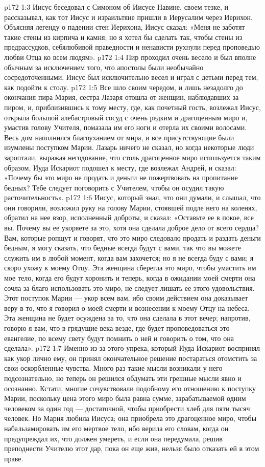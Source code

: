 \vs p172 1:3 Иисус беседовал с Симоном об Иисусе Навине, своем тезке, и рассказывал, как тот Иисус и израильтяне пришли в Иерусалим через Иерихон. Объясняя легенду о падении стен Иерихона, Иисус сказал: «Меня не заботят такие стены из кирпича и камня; но я хотел бы сделать так, чтобы стены из предрассудков, себялюбивой праведности и ненависти рухнули перед проповедью любви Отца ко всем людям».
\vs p172 1:4 Пир проходил очень весело и был вполне обычным за исключением того, что апостолы были необычайно сосредоточенными. Иисус был исключительно весел и играл с детьми перед тем, как подойти к столу.
\vs p172 1:5 \pc Все шло своим чередом, и лишь незадолго до окончания пира Мария, сестра Лазаря отошла от женщин, наблюдавших за пиром, и, приблизившись к тому месту, где, как почетный гость, возлежал Иисус, открыла большой алебастровый сосуд с очень редким и драгоценным миро и, умастив голову Учителя, помазала им его ноги и отерла их своими волосами. Весь дом наполнился благоуханием от мира, и все присутствующие были изумлены поступком Марии. Лазарь ничего не сказал, но когда некоторые люди зароптали, выражая негодование, что столь драгоценное миро используется таким образом, Иуда Искариот подошел к месту, где возлежал Андрей, и сказал: «Почему бы это миро не продать и деньги не пожертвовать на пропитание бедных? Тебе следует поговорить с Учителем, чтобы он осудил такую расточительность».
\vs p172 1:6 Иисус, который знал, что они думали, и слышал, что они говорили, возложил руку на голову Марии, стоявшей подле него на коленях, обратил на нее взор, исполненный доброты, и сказал: «Оставьте ее в покое, все вы. Почему вы ее укоряете за это, хотя она сделала доброе дело от всего сердца? Вам, которые ропщут и говорят, что это миро следовало продать и раздать деньги бедным, я могу сказать, что бедные всегда будут с вами, так что вы можете служить им в любой момент, когда вам захочется; но я не всегда буду с вами; я скоро ухожу к моему Отцу. Эта женщина сберегла это миро, чтобы умастить им мое тело, когда его будут хоронить и теперь, когда в ожидании моей смерти она сочла за благо использовать это миро, не следует лишать ее этого удовольствия. Этот поступок Марии --- укор всем вам, ибо своим действием она доказывает веру в то, что я говорил о моей смерти и вознесении к моему Отцу на небеса. Эта женщина не будет осуждена за то, что она сделала в этот вечер; напротив, говорю я вам, что в грядущие века везде, где будет проповедоваться это евангелие, по всему свету будут помнить о ней и говорить о том, что она сделала».
\vs p172 1:7 Именно из\hyp{}за этого упрека, который Иуда Искариот воспринял как укор лично ему, он принял окончательное решение постараться отомстить за свои оскорбленные чувства. Много раз такие мысли возникали у него подсознательно, но теперь он решился обдумать эти грешные мысли явно и осознанно. Кстати, многие сочувствовали подобному его отношению к поступку Марии, поскольку цена этого миро была равна сумме, зарабатываемой одним человеком за один год --- достаточной, чтобы приобрести хлеб для пяти тысяч человек. Но Мария любила Иисуса; она приобрела это драгоценное миро, чтобы набальзамировать им его мертвое тело, ибо верила его словам, когда он предупреждал их, что должен умереть, и если она передумала, решив преподнести Учителю этот дар, пока он еще жив, нельзя было отказать ей в этом праве.
